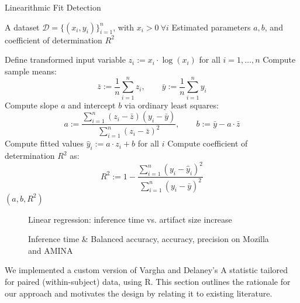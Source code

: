 \documentclass[conference]{IEEEtran}
\begin{document}
\begin{algorithm*}[ht]
    \caption{Linearithmic Fit Detection}
    \begin{algorithmic}[1]
    \REQUIRE A dataset \( \mathcal{D} = \{(x_i, y_i)\}_{i=1}^n \), with \( x_i > 0 \ \forall i \)
    \ENSURE Estimated parameters \( a, b \), and coefficient of determination \( R^2 \)
    
    \STATE Define transformed input variable \( z_i := x_i \cdot \log(x_i) \) for all \( i = 1, \dots, n \)
    \STATE Compute sample means:
        \[
        \bar{z} := \frac{1}{n} \sum_{i=1}^n z_i, \qquad \bar{y} := \frac{1}{n} \sum_{i=1}^n y_i
        \]
    \STATE Compute slope \( a \) and intercept \( b \) via ordinary least squares:
        \[
        a := \frac{\sum_{i=1}^n (z_i - \bar{z})(y_i - \bar{y})}{\sum_{i=1}^n (z_i - \bar{z})^2}, \qquad
        b := \bar{y} - a \cdot \bar{z}
        \]
    \STATE Compute fitted values \( \hat{y}_i := a \cdot z_i + b \) for all \( i \)
    \STATE Compute coefficient of determination \( R^2 \) as:
        \[
        R^2 := 1 - \frac{\sum_{i=1}^n (y_i - \hat{y}_i)^2}{\sum_{i=1}^n (y_i - \bar{y})^2}
        \]
    \RETURN \( (a, b, R^2) \)
    
    \end{algorithmic}
\end{algorithm*}

\begin{figure}[H]
    \centering
    
    \caption{Linear regression: inference time vs. artifact size increase}
    \label{fig:RQ3_lin_regression}
\end{figure}

\begin{figure}[H]
    \centering
    
    \caption{Inference time \& Balanced accuracy, accuracy, precision on Mozilla and AMINA}
    \label{fig:RQ3_lin_regression}
\end{figure}

\newpage

\vspace{2em} %
\newpage
{}

We implemented a custom version of Vargha and Delaney’s A statistic \cite{vargha2000Effect} tailored for paired (within-subject) data, using R. This section outlines the rationale for our approach and motivates the design by relating it to existing literature.
\end{document}
